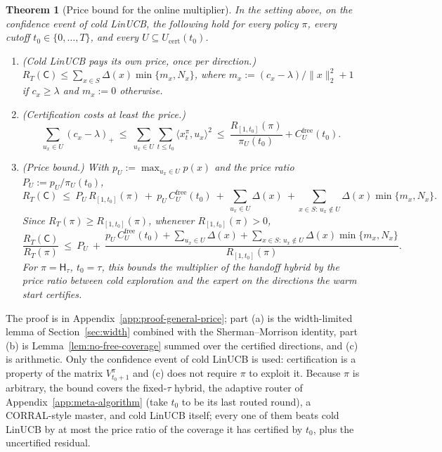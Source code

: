 \documentclass{article}
\newtheorem{theorem}{Theorem}
\theoremstyle{definition}
\theoremstyle{remark}
\theoremstyle{remark}
\newcommand{\Cold}{\mathsf{C}}
\newcommand{\Hyb}{\mathsf{H}}
\begin{document}
\begin{theorem}[Price bound for the online multiplier]
\label{thm:general-price}
In the setting above, on the confidence event of cold LinUCB, the following
hold for every policy $\pi$, every cutoff $t_0\in\{0,\dots,T\}$, and every
$U\subseteq U_{\mathrm{cert}}(t_0)$.
\begin{enumerate}[itemsep=1pt,topsep=1pt,leftmargin=*]
\item[(a)] \emph{(Cold LinUCB pays its own price, once per direction.)}
$R_T(\Cold)\le\sum_{x\in S}\Delta(x)\min\{m_x,N_x\}$, where
$m_x:=(c_x-\lambda)/\|x\|_2^2+1$ if $c_x\ge\lambda$ and $m_x:=0$ otherwise.
\item[(b)] \emph{(Certification costs at least the price.)}
\[
\sum_{u_x\in U}(c_x-\lambda)_+\ \le\ \sum_{u_x\in U}\sum_{t\le t_0}\langle x^\pi_t,u_x\rangle^2
\ \le\ \frac{R_{[1,t_0]}(\pi)}{\pi_U(t_0)}+C^{\mathrm{free}}_U(t_0).
\]
\item[(c)] \emph{(Price bound.)} With $p_U:=\max_{u_x\in U}p(x)$ and the
price ratio $P_U:=p_U/\pi_U(t_0)$,
\[
R_T(\Cold)\ \le\ P_U\,R_{[1,t_0]}(\pi)\ +\ p_U\,C^{\mathrm{free}}_U(t_0)\ +\ \sum_{u_x\in U}\Delta(x)
\ +\sum_{x\in S:\,u_x\notin U}\Delta(x)\min\{m_x,N_x\}.
\]
Since $R_T(\pi)\ge R_{[1,t_0]}(\pi)$, whenever $R_{[1,t_0]}(\pi)>0$,
\begin{equation}
\label{eq:general-price}
\frac{R_T(\Cold)}{R_T(\pi)}\ \le\ P_U\ +\
\frac{p_U\,C^{\mathrm{free}}_U(t_0)+\sum_{u_x\in U}\Delta(x)+\sum_{x\in S:\,u_x\notin U}\Delta(x)\min\{m_x,N_x\}}{R_{[1,t_0]}(\pi)} .
\end{equation}
For $\pi=\Hyb_\tau$, $t_0=\tau$, this bounds the multiplier of the handoff
hybrid by the price ratio between cold exploration and the expert on the
directions the warm start certifies.
\end{enumerate}
\end{theorem}

The proof is in Appendix~\ref{app:proof-general-price}; part (a) is the
width-limited lemma of Section~\ref{sec:width} combined with the
Sherman--Morrison identity, part (b) is Lemma~\ref{lem:no-free-coverage}
summed over the certified directions, and (c) is arithmetic. Only the
confidence event of cold LinUCB is used: certification is a property of the
matrix $V^\pi_{t_0+1}$ and (c) does not require $\pi$ to exploit it. Because
$\pi$ is arbitrary, the bound covers the fixed-$\tau$ hybrid, the adaptive
router of Appendix~\ref{app:meta-algorithm} (take $t_0$ to be its last routed
round), a CORRAL-style master, and cold LinUCB itself; every one of them
beats cold LinUCB by at most the price ratio of the coverage it has certified
by $t_0$, plus the uncertified residual.
\end{document}

